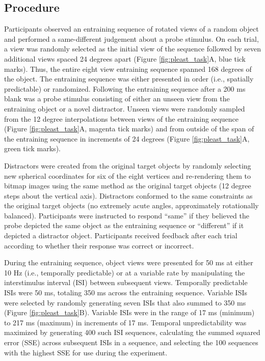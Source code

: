 \documentclass[dwyatte_dissertation.tex]{subfiles}
\begin{document}
\subsection{Procedure}
Participants observed an entraining sequence of rotated views of a random object and performed a same-different judgement about a probe stimulus. On each trial, a view was randomly selected as the initial view of the sequence followed by seven additional views spaced 24 degrees apart (Figure \ref{fig:pleast_task}A, blue tick marks). Thus, the entire eight view entraining sequence spanned 168 degrees of the object. The entraining sequence was either presented in order (i.e., spatially predictable) or randomized. Following the entraining sequence after a 200 ms blank was a probe stimulus consisting of either an unseen view from the entraining object or a novel distractor. Unseen views were randomly sampled from the 12 degree interpolations between views of the entraining sequence (Figure \ref{fig:pleast_task}A, magenta tick marks) and from outside of the span of the entraining sequence in increments of 24 degrees (Figure \ref{fig:pleast_task}A, green tick marks).

Distractors were created from the original target objects by randomly selecting new spherical coordinates for six of the eight vertices and re-rendering them to bitmap images using the same method as the original target objects (12 degree steps about the vertical axis). Distractors conformed to the same constraints as the original target objects (no extremely acute angles, approximately rotationally balanced). Participants were instructed to respond ``same'' if they believed the probe depicted the same object as the entraining sequence or ``different'' if it depicted a distractor object. Participants received feedback after each trial according to whether their response was correct or incorrect. %

During the entraining sequence, object views were presented for 50 ms at either 10 Hz (i.e., temporally predictable) or at a variable rate by manipulating the interstimulus interval (ISI) between subsequent views. Temporally predictable ISIs were 50 ms, totaling 350 ms across the entraining sequence. Variable ISIs were selected by randomly generating seven ISIs that also summed to 350 ms (Figure \ref{fig:pleast_task}B). Variable ISIs were in the range of 17 ms (minimum) to 217 ms (maximum) in increments of 17 ms. Temporal unpredictability was maximized by generating 400 such ISI sequences, calculating the summed squared error (SSE) across subsequent ISIs in a sequence, and selecting the 100 sequences with the highest SSE for use during the experiment.
\end{document}
